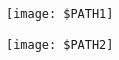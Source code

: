 \begin{figure}[t]
        \begin{minipage}{0.5\textwidth}
            \centering
            \texttt{[image: \$PATH1]}
            \caption{}
        \end{minipage}%
        \begin{minipage}{0.5\textwidth}
            \centering
            \texttt{[image: \$PATH2]}
            \caption{}
        \end{minipage}
\end{figure}
